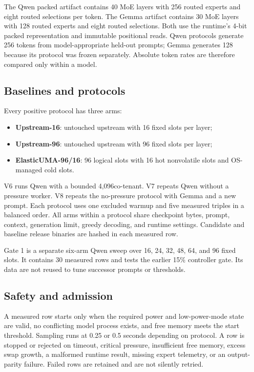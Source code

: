 The Qwen packed artifact contains 40 MoE layers with 256 routed experts and
eight routed selections per token. The Gemma artifact contains 30 MoE layers
with 128 routed experts and eight routed selections. Both use the runtime's
4-bit packed representation and immutable positional reads. Qwen protocols
generate 256 tokens from model-appropriate held-out prompts; Gemma generates
128 because its protocol was frozen separately. Absolute token rates are
therefore compared only within a model.

\subsection{Baselines and protocols}

Every positive protocol has three arms:

\begin{itemize}
  \item \textbf{Upstream-16}: untouched upstream with 16 fixed slots per layer;
  \item \textbf{Upstream-96}: untouched upstream with 96 fixed slots per layer;
  \item \textbf{ElasticUMA-96/16}: 96 logical slots with 16 hot nonvolatile
  slots and OS-managed cold slots.
\end{itemize}

V6 runs Qwen with a bounded 4,096\mib co-tenant. V7 repeats Qwen without a
pressure worker. V8 repeats the no-pressure protocol with Gemma and a new
prompt. Each protocol uses one excluded warmup and five measured triples in a
balanced order. All arms within a protocol share checkpoint bytes, prompt,
context, generation limit, greedy decoding, and runtime settings. Candidate and
baseline release binaries are hashed in each measured row.

Gate 1 is a separate six-arm Qwen sweep over 16, 24, 32, 48, 64, and 96 fixed
slots. It contains 30 measured rows and tests the earlier 15\% controller gate.
Its data are not reused to tune successor prompts or thresholds.

\subsection{Safety and admission}

A measured row starts only when the required power and low-power-mode state are
valid, no conflicting model process exists, and free memory meets the start
threshold. Sampling runs at 0.25 or 0.5 seconds depending on protocol. A row is
stopped or rejected on timeout, critical pressure, insufficient free memory,
excess swap growth, a malformed runtime result, missing expert telemetry, or an
output-parity failure. Failed rows are retained and are not silently retried.


